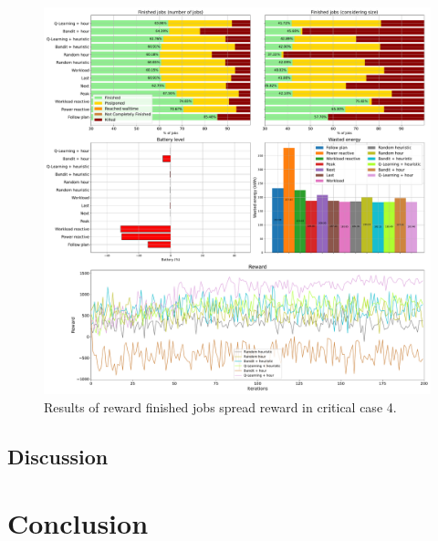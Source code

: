 \begin{figure}[!htb]
    \centering
    \includegraphics[scale=0.29]{Images/Learning_compensations/reward_finished_spread_profile_worst_workload_2_with_noise_state_delta.pdf}
    \caption{Results of reward finished jobs spread reward in critical case 4.}
    \label{fig:spread_reward_results_critical_4}
\end{figure}

\clearpage

\subsection{Discussion}

\section{Conclusion}
